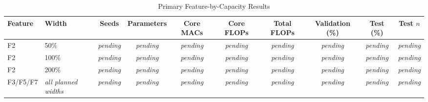 \begin{table}[!t]
\caption{Primary Feature-by-Capacity Results}
\label{tab:feature-capacity}
\centering
\footnotesize
\begin{tabular}{@{}llcccccccc@{}}
\toprule
Feature & Width & Seeds & Parameters & Core MACs & Core FLOPs & Total FLOPs & Validation (\%) & Test (\%) & Test $n$ \\
\midrule
F2 & 50\% & \textit{pending} & \textit{pending} & \textit{pending} & \textit{pending} & \textit{pending} & \textit{pending} & \textit{pending} & \textit{pending} \\
F2 & 100\% & \textit{pending} & \textit{pending} & \textit{pending} & \textit{pending} & \textit{pending} & \textit{pending} & \textit{pending} & \textit{pending} \\
F2 & 200\% & \textit{pending} & \textit{pending} & \textit{pending} & \textit{pending} & \textit{pending} & \textit{pending} & \textit{pending} & \textit{pending} \\
F3/F5/F7 & \textit{all planned widths} & \textit{pending} & \textit{pending} & \textit{pending} & \textit{pending} & \textit{pending} & \textit{pending} & \textit{pending} & \textit{pending} \\
\bottomrule
\end{tabular}
\end{table}
